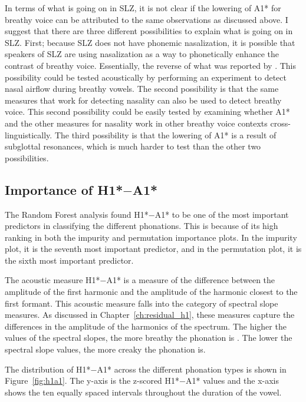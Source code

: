 In terms of what is going on in SLZ, it is not clear if the lowering of A1* for breathy voice can be attributed to the same observations as discussed above. I suggest that there are three different possibilities to explain what is going on in SLZ. First; because SLZ does not have phonemic nasalization, it is possible that speakers of SLZ are using nasalization as a way to phonetically enhance the contrast of breathy voice. Essentially, the reverse of what was reported by \citet{garellekBreathyVoiceNasality2016}. This possibility could be tested acoustically by performing an experiment to detect nasal airflow during breathy vowels. The second possibility is that the same measures that work for detecting nasality can also be used to detect breathy voice. This second possibility could be easily tested by examining whether A1* and the other measures for nasality work in other breathy voice contexts cross-linguistically. The third possibility is that the lowering of A1* is a result of subglottal resonances, which is much harder to test than the other two possibilities. 

\subsection{Importance of \texorpdfstring{H1*$-$A1*}{H1*-A1*}} \label{sec:h1a1_discussion}

The Random Forest analysis found H1*$-$A1* to be one of the most important predictors in classifying the different phonations. This is because of its high ranking in both the impurity and permutation importance plots. In the impurity plot, it is the seventh most important predictor, and in the permutation plot, it is the sixth most important predictor.

The acoustic measure H1*$-$A1* is a measure of the difference between the amplitude of the first harmonic and the amplitude of the harmonic closest to the first formant. This acoustic measure falls into the category of spectral slope measures. As discussed in Chapter~\ref{ch:residual_h1}, these measures capture the differences in the amplitude of the harmonics of the spectrum. The higher the values of the spectral slopes, the more breathy the phonation is \citep{fischer-jorgensenPhoneticAnalysisBreathy1968}. The lower the spectral slope values, the more creaky the phonation is.

The distribution of H1*$-$A1* across the different phonation types is shown in Figure~\ref{fig:h1a1}. The y-axis is the z-scored H1*$-$A1* values and the x-axis shows the ten equally spaced intervals throughout the duration of the vowel. 

